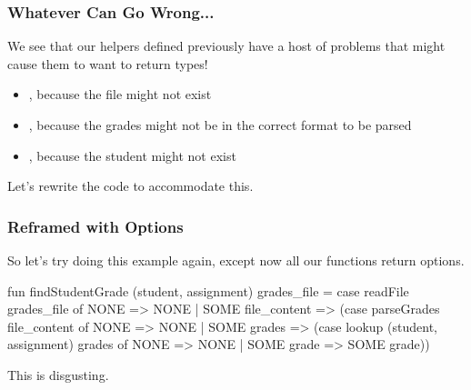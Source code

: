 \documentclass[aspectratio=169]{beamer}
\begin{document}
\begin{frame}[fragile]
  \frametitle{Whatever Can Go Wrong...}

  We see that our helpers defined previously have a host of problems that 
  might cause them to want to return  types!

  \pause
  \vspace{\fill}

  \begin{itemize} 
    \item {}, because the file might not exist 
    \item {}, because the grades might not be in the
    correct format to be parsed 
    \item {}, because the student might not exist 
  \end{itemize}

  \pause
  \vspace{\fill}

  Let's rewrite the code to accommodate this.
\end{frame}


\begin{frame}[fragile]
  \frametitle{Reframed with Options}

  So let's try doing this example again, except now all our functions return options.

  \pause
  \vspace{\fill}

  \begin{codeblock}
    fun findStudentGrade (student, assignment) grades_file =
      case readFile grades_file of
        NONE => NONE
      | SOME file_content => 
        (case parseGrades file_content of 
          NONE => NONE
        | SOME grades =>
          (case lookup (student, assignment) grades of 
            NONE => NONE 
          | SOME grade => SOME grade))
  \end{codeblock}

  \pause
  \vspace{\fill}

  This is disgusting.
\end{frame}
\end{document}
